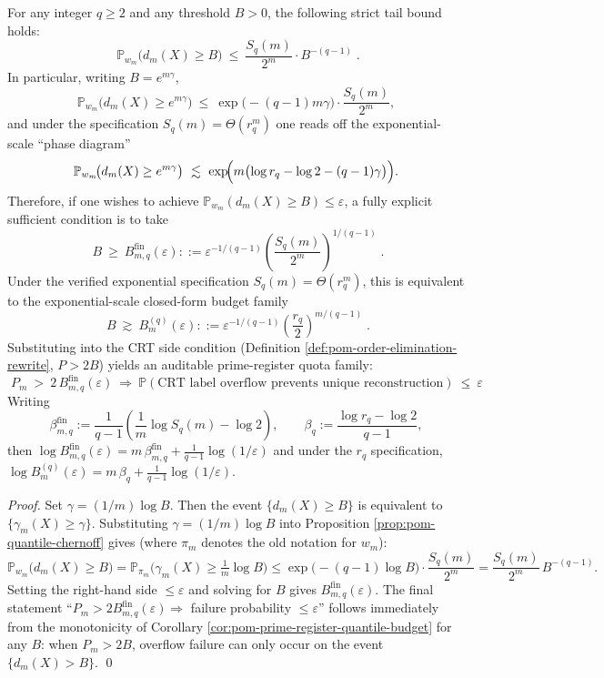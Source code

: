 \begin{corollary}\label{cor:pom-prime-register-q-quota-family}
For any integer \(q\ge 2\) and any threshold \(B>0\), the following strict tail bound holds:
\[
\boxed{\;
\mathbb{P}_{w_m}\!\bigl(d_m(X)\ge B\bigr)
\ \le\
\frac{S_q(m)}{2^m}\cdot B^{-(q-1)}\; }.
\]
In particular, writing \(B=e^{m\gamma}\),
\[
\mathbb{P}_{w_m}\!\bigl(d_m(X)\ge e^{m\gamma}\bigr)
\ \le\
\exp\!\bigl(-(q-1)m\gamma\bigr)\cdot \frac{S_q(m)}{2^m},
\]
and under the specification \(S_q(m)=\Theta(r_q^m)\) one reads off the exponential-scale ``phase diagram''
\[
\mathbb{P}_{w_m}\!\bigl(d_m(X)\ge e^{m\gamma}\bigr)
\ \lesssim\
\exp\!\Bigl(m\bigl(\log r_q-\log 2-(q-1)\gamma\bigr)\Bigr).
\]
Therefore, if one wishes to achieve \(\mathbb{P}_{w_m}(d_m(X)\ge B)\le \varepsilon\), a fully explicit sufficient condition is to take
\[
\boxed{\;
B\ \ge\ B_{m,q}^{\mathrm{fin}}(\varepsilon)
::=\varepsilon^{-1/(q-1)}\left(\frac{S_q(m)}{2^m}\right)^{\!1/(q-1)}\; }.
\]
Under the verified exponential specification \(S_q(m)=\Theta(r_q^m)\), this is equivalent to the exponential-scale closed-form budget family
\[
\boxed{\;
B\ \gtrsim\ B_m^{(q)}(\varepsilon)
::=\varepsilon^{-1/(q-1)}\left(\frac{r_q}{2}\right)^{\!m/(q-1)}\; }.
\]
Substituting into the CRT side condition (Definition \ref{def:pom-order-elimination-rewrite}, \(P>2B\)) yields an auditable prime-register quota family:
\[
\boxed{\;
P_m\ >\ 2\,B_{m,q}^{\mathrm{fin}}(\varepsilon)
\ \Longrightarrow\
\mathbb{P}(\text{CRT label overflow prevents unique reconstruction})\ \le\ \varepsilon\; }.
\]
Writing
\[
\beta_{m,q}^{\mathrm{fin}}
:=\frac{1}{q-1}\left(\frac{1}{m}\log S_q(m)-\log 2\right),
\qquad
\beta_q:=\frac{\log r_q-\log 2}{q-1},
\]
then
\(
\log B_{m,q}^{\mathrm{fin}}(\varepsilon)
=m\,\beta_{m,q}^{\mathrm{fin}}+\frac{1}{q-1}\log(1/\varepsilon)
\)
and under the \(r_q\) specification,
\(
\log B_m^{(q)}(\varepsilon)=m\,\beta_q+\frac{1}{q-1}\log(1/\varepsilon)
\).
\end{corollary}
\begin{proof}
Set \(\gamma=(1/m)\log B\). Then the event \(\{d_m(X)\ge B\}\) is equivalent to \(\{\gamma_m(X)\ge \gamma\}\).
Substituting \(\gamma=(1/m)\log B\) into Proposition \ref{prop:pom-quantile-chernoff} gives (where \(\pi_m\) denotes the old notation for \(w_m\)):
\[
\mathbb{P}_{w_m}\!\bigl(d_m(X)\ge B\bigr)
=\mathbb{P}_{\pi_m}\!\bigl(\gamma_m(X)\ge \tfrac{1}{m}\log B\bigr)
\le
\exp\!\bigl(-(q-1)\log B\bigr)\cdot \frac{S_q(m)}{2^m}
=\frac{S_q(m)}{2^m}\,B^{-(q-1)}.
\]
Setting the right-hand side \(\le \varepsilon\) and solving for \(B\) gives \(B_{m,q}^{\mathrm{fin}}(\varepsilon)\).
The final statement ``\(P_m>2B_{m,q}^{\mathrm{fin}}(\varepsilon)\Rightarrow\) failure probability \(\le\varepsilon\)'' follows immediately from the monotonicity of Corollary \ref{cor:pom-prime-register-quantile-budget} for any \(B\): when \(P_m>2B\), overflow failure can only occur on the event \(\{d_m(X)>B\}\).
\qed
\end{proof}

